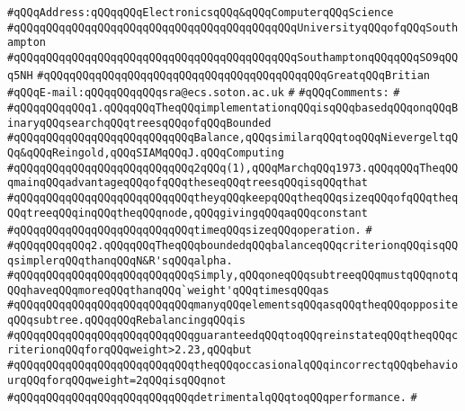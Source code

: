 \verb|#qQQqAddress:qQQqqQQqElectronicsqQQq&qQQqComputerqQQqScience|\newline
\verb|#qQQqqQQqqQQqqQQqqQQqqQQqqQQqqQQqqQQqqQQqqQQqUniversityqQQqofqQQqSouthampton|\newline
\verb|#qQQqqQQqqQQqqQQqqQQqqQQqqQQqqQQqqQQqqQQqqQQqSouthamptonqQQqqQQqSO9qQQq5NH|\newline
\verb|#qQQqqQQqqQQqqQQqqQQqqQQqqQQqqQQqqQQqqQQqqQQqGreatqQQqBritian|\newline
\verb|#qQQqE-mail:qQQqqQQqqQQqsra@ecs.soton.ac.uk|\newline
\verb|#|\newline
\verb|#qQQqComments:|\newline
\verb|#|\newline
\verb|#qQQqqQQqqQQq1.qQQqqQQqTheqQQqimplementationqQQqisqQQqbasedqQQqonqQQqBinaryqQQqsearchqQQqtreesqQQqofqQQqBounded|\newline
\verb|#qQQqqQQqqQQqqQQqqQQqqQQqqQQqBalance,qQQqsimilarqQQqtoqQQqNievergeltqQQq&qQQqReingold,qQQqSIAMqQQqJ.qQQqComputing|\newline
\verb|#qQQqqQQqqQQqqQQqqQQqqQQqqQQq2qQQq(1),qQQqMarchqQQq1973.qQQqqQQqTheqQQqmainqQQqadvantageqQQqofqQQqtheseqQQqtreesqQQqisqQQqthat|\newline
\verb|#qQQqqQQqqQQqqQQqqQQqqQQqqQQqtheyqQQqkeepqQQqtheqQQqsizeqQQqofqQQqtheqQQqtreeqQQqinqQQqtheqQQqnode,qQQqgivingqQQqaqQQqconstant|\newline
\verb|#qQQqqQQqqQQqqQQqqQQqqQQqqQQqtimeqQQqsizeqQQqoperation.|\newline
\verb|#|\newline
\verb|#qQQqqQQqqQQq2.qQQqqQQqTheqQQqboundedqQQqbalanceqQQqcriterionqQQqisqQQqsimplerqQQqthanqQQqN&R'sqQQqalpha.|\newline
\verb|#qQQqqQQqqQQqqQQqqQQqqQQqqQQqSimply,qQQqoneqQQqsubtreeqQQqmustqQQqnotqQQqhaveqQQqmoreqQQqthanqQQq`weight'qQQqtimesqQQqas|\newline
\verb|#qQQqqQQqqQQqqQQqqQQqqQQqqQQqmanyqQQqelementsqQQqasqQQqtheqQQqoppositeqQQqsubtree.qQQqqQQqRebalancingqQQqis|\newline
\verb|#qQQqqQQqqQQqqQQqqQQqqQQqqQQqguaranteedqQQqtoqQQqreinstateqQQqtheqQQqcriterionqQQqforqQQqweight>2.23,qQQqbut|\newline
\verb|#qQQqqQQqqQQqqQQqqQQqqQQqqQQqtheqQQqoccasionalqQQqincorrectqQQqbehaviourqQQqforqQQqweight=2qQQqisqQQqnot|\newline
\verb|#qQQqqQQqqQQqqQQqqQQqqQQqqQQqdetrimentalqQQqtoqQQqperformance.|\newline
\verb|#|\newline
